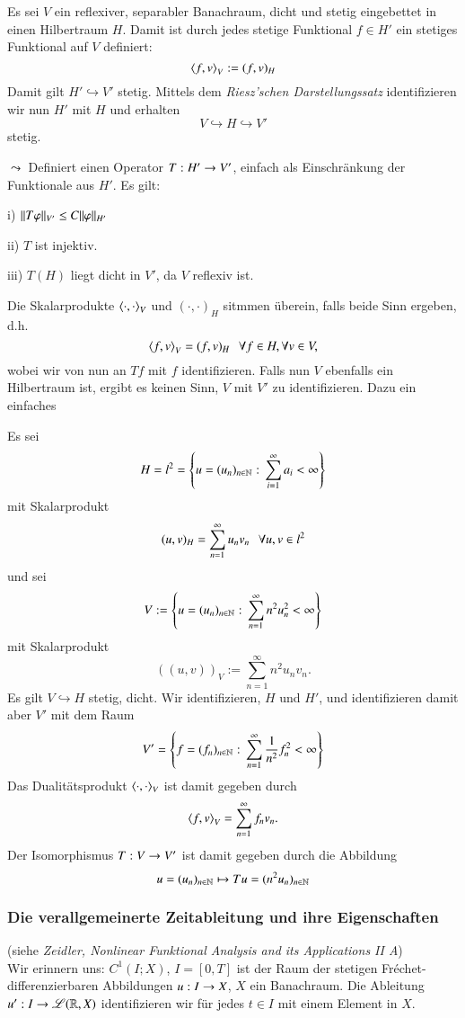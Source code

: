 Es sei $V$ ein reflexiver, separabler Banachraum, dicht und stetig eingebettet in einen Hilbertraum $H$.
Damit ist durch jedes stetige Funktional $f\in H'$ ein stetiges Funktional auf $V$ definiert:
\[
    \left\langle f,v \right\rangle _V := (f,v)_H
\]
Damit gilt $H'\hookrightarrow V'$ stetig. Mittels dem \textit{Riesz'schen Darstellungssatz} identifizieren wir nun
$H'$ mit $H$ und erhalten
\[
    V \hookrightarrow H \hookrightarrow V'
\]
stetig.

\noindent$\leadsto$ Definiert einen Operator $T:H'\rightarrow V'$, einfach als Einschränkung der Funktionale aus
$H'$. Es gilt:
\begin{description}
    \item{i)} $\|T\varphi\|_{V'}\leq C\|\varphi\|_{H'}$
    \item{ii)} $T$ ist injektiv.
    \item{iii)} $T(H)$ liegt dicht in $V'$, da $V$ reflexiv ist.
\end{description}
Die Skalarprodukte $\left\langle \cdot,\cdot \right\rangle_V$ und $(\cdot,\cdot)_H$ sitmmen überein, falls beide Sinn
ergeben, d.h.
\[
    \left\langle f,v\right\rangle_V=(f,v)_H \hspace{.25cm} \forall f\in H, \forall v\in V,
\]
wobei wir von nun an $Tf$ mit $f$ identifizieren. Falls nun $V$ ebenfalls ein Hilbertraum ist, ergibt es
keinen Sinn, $V$ mit $V'$ zu identifizieren. Dazu ein einfaches

\begin{beispiel}
    Es sei
    \[
        H=l^2= \left\{ u=(u_n)_{n\in\mathbb{N}} : \, \sum_{i=1}^\infty a_i<\infty\right\}
    \]
    mit Skalarprodukt
    \[
        (u,v)_H=\sum_{n=1}^\infty u_nv_n \hspace{.25cm} \forall u,v\in l^2
    \]
    und sei
    \[
        V:=\left\{u=(u_n)_{n\in\mathbb{N}}:\, \sum_{n=1}^\infty n^2u_n^2<\infty\right\}
    \]
    mit Skalarprodukt
    \[
        ((u,v))_V:= \sum_{n=1}^\infty n^2u_nv_n.
    \]
    Es gilt $V\hookrightarrow H$ stetig, dicht. Wir identifizieren, $H$ und $H'$, und identifizieren
    damit aber $V'$ mit dem Raum 
    \[
        V'=\left\{ f=(f_n)_{n\in\mathbb{N}}: \, \sum_{n=1}^\infty \frac1{n^2} f_n^2 <\infty\right\}
    \]
    Das Dualitätsprodukt $\left\langle\cdot,\cdot\right\rangle_V$ ist damit gegeben durch
    \[
        \left\langle f,v\right\rangle_V=\sum_{n=1}^\infty f_nv_n.
    \]
    Der Isomorphismus $T:V\rightarrow V'$ ist damit gegeben durch die Abbildung
    \[
        u=(u_n)_{n\in\mathbb{N}}\mapsto Tu=(n^2u_n)_{n\in\mathbb{N}}
    \]
\end{beispiel}

\subsubsection*{Die verallgemeinerte Zeitableitung und ihre Eigenschaften}
(siehe \textit{Zeidler, Nonlinear Funktional Analysis and its Applications II A})\\[.5cm]
\noindent Wir erinnern uns: $C^1(I;X)$, $I=[0,T]$ ist der Raum der stetigen Fréchet-differenzierbaren
Abbildungen $u:I\rightarrow X$, $X$ ein Banachraum. Die Ableitung $u': I\rightarrow \mathscr L(\mathbb{R},X)$ identifizieren wir für
jedes $t\in I$ mit einem Element in $X$.


